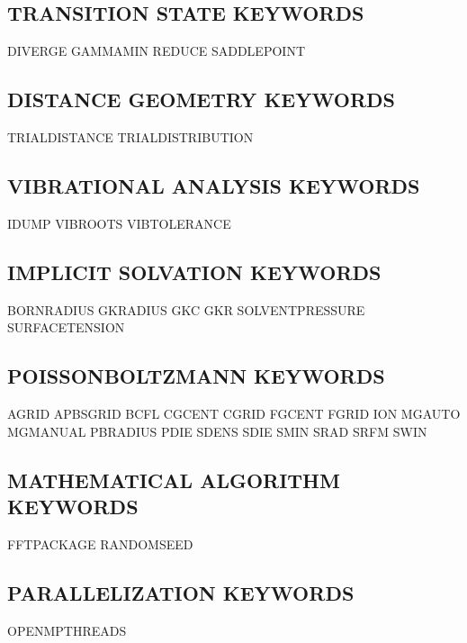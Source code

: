 \documentclass[letterpaper,11pt,english]{sphinxmanual}
\begin{document}
\subsection{TRANSITION STATE KEYWORDS}
\label{\detokenize{text/keywords:transition-state-keywords}}
DIVERGE GAMMAMIN        REDUCE
SADDLEPOINT


\subsection{DISTANCE GEOMETRY KEYWORDS}
\label{\detokenize{text/keywords:distance-geometry-keywords}}
TRIAL\sphinxhyphen{}DISTANCE  TRIAL\sphinxhyphen{}DISTRIBUTION


\subsection{VIBRATIONAL ANALYSIS KEYWORDS}
\label{\detokenize{text/keywords:vibrational-analysis-keywords}}
IDUMP   VIB\sphinxhyphen{}ROOTS       VIB\sphinxhyphen{}TOLERANCE


\subsection{IMPLICIT SOLVATION KEYWORDS}
\label{\detokenize{text/keywords:implicit-solvation-keywords}}
BORN\sphinxhyphen{}RADIUS     GK\sphinxhyphen{}RADIUS       GKC
GKR     SOLVENT\sphinxhyphen{}PRESSURE        SURFACE\sphinxhyphen{}TENSION


\subsection{POISSON\sphinxhyphen{}BOLTZMANN KEYWORDS}
\label{\detokenize{text/keywords:poisson-boltzmann-keywords}}
AGRID   APBS\sphinxhyphen{}GRID       BCFL
CGCENT  CGRID   FGCENT
FGRID   ION     MG\sphinxhyphen{}AUTO
MG\sphinxhyphen{}MANUAL       PB\sphinxhyphen{}RADIUS       PDIE
SDENS   SDIE    SMIN
SRAD    SRFM    SWIN


\subsection{MATHEMATICAL ALGORITHM KEYWORDS}
\label{\detokenize{text/keywords:mathematical-algorithm-keywords}}
FFT\sphinxhyphen{}PACKAGE     RANDOMSEED


\subsection{PARALLELIZATION KEYWORDS}
\label{\detokenize{text/keywords:parallelization-keywords}}
OPENMP\sphinxhyphen{}THREADS
\end{document}
